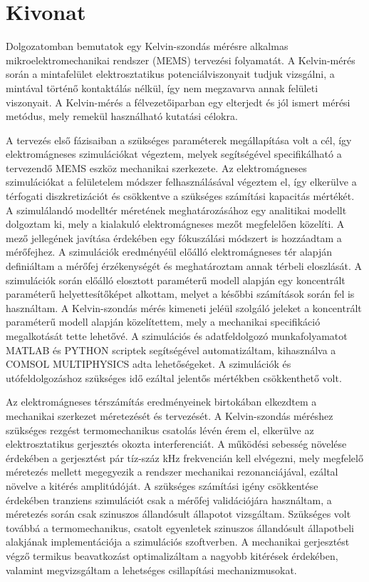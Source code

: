 \chapter*{Kivonat}

Dolgozatomban bemutatok egy Kelvin-szondás mérésre alkalmas mikroelektromechanikai rendszer (MEMS) tervezési folyamatát. A Kelvin-mérés során a mintafelület elektrosztatikus potenciálviszonyait tudjuk vizsgálni, a mintával történő kontaktálás nélkül, így nem megzavarva annak felületi viszonyait. A Kelvin-mérés a félvezetőiparban egy elterjedt és jól ismert mérési metódus, mely remekül használható kutatási célokra.

A tervezés első fázisaiban a szükséges paraméterek megállapítása volt a cél, így elektromágneses szimulációkat végeztem, melyek segítségével specifikálható a tervezendő MEMS eszköz mechanikai szerkezete. Az elektromágneses szimulációkat a felületelem módszer felhasználásával végeztem el, így elkerülve a térfogati diszkretizációt és csökkentve a szükséges számítási kapacitás mértékét. A szimulálandó modelltér méretének meghatározásához egy analitikai modellt dolgoztam ki, mely a kialakuló elektromágneses mezőt megfelelően közelíti. A mező jellegének javítása érdekében egy fókuszálási módszert is hozzáadtam a mérőfejhez. A szimulációk eredményéül előálló elektromágneses tér alapján definiáltam a mérőfej érzékenységét és meghatároztam annak térbeli eloszlását. A szimulációk során előálló elosztott paraméterű modell alapján egy koncentrált paraméterű helyettesítőképet alkottam, melyet a későbbi számítások során fel is használtam. A Kelvin-szondás mérés kimeneti jeléül szolgáló jeleket a koncentrált paraméterű modell alapján közelítettem, mely a mechanikai specifikáció megalkotását tette lehetővé. A szimulációs és adatfeldolgozó munkafolyamatot MATLAB és PYTHON scriptek segítségével automatizáltam, kihasználva a COMSOL MULTIPHYSICS adta lehetőségeket. A szimulációk és utófeldolgozáshoz szükséges idő ezáltal jelentős mértékben csökkenthető volt.

Az elektromágneses térszámítás eredményeinek birtokában elkezdtem a mechanikai szerkezet méretezését és tervezését. A Kelvin-szondás méréshez szükséges rezgést termomechanikus csatolás lévén érem el, elkerülve az elektrosztatikus gerjesztés okozta interferenciát. A működési sebesség növelése érdekében a gerjesztést pár tíz-száz kHz frekvencián kell elvégezni, mely megfelelő méretezés mellett megegyezik a rendszer mechanikai rezonanciájával, ezáltal növelve a kitérés amplitúdóját. A szükséges számítási igény csökkentése érdekében tranziens szimulációt csak a mérőfej validációjára használtam, a méretezés során csak szinuszos állandósult állapotot vizsgáltam. Szükséges volt továbbá a termomechanikus, csatolt egyenletek szinuszos állandósult állapotbeli alakjának implementációja a szimulációs szoftverben. A mechanikai gerjesztést végző termikus beavatkozást optimalizáltam a nagyobb kitérések érdekében, valamint megvizsgáltam a lehetséges csillapítási mechanizmusokat.

